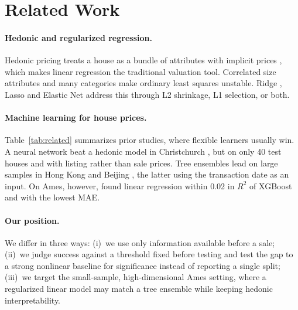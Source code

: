 \section{Related Work}
\label{sec:related}

\paragraph{Hedonic and regularized regression.}
Hedonic pricing treats a house as a bundle of attributes with implicit prices \citep{rosen1974hedonic}, which makes linear regression the traditional valuation tool.
Correlated size attributes and many categories make ordinary least squares unstable.
Ridge \citep{hoerl1970ridge}, Lasso \citep{tibshirani1996lasso} and Elastic Net \citep{zou2005elastic} address this through L2 shrinkage, L1 selection, or both.

\paragraph{Machine learning for house prices.}
Table~\ref{tab:related} summarizes prior studies, where flexible learners usually win.
A neural network beat a hedonic model in Christchurch \citep{limsombunchai2004house}, but on only 40 test houses and with listing rather than sale prices.
Tree ensembles lead on large samples in Hong Kong \citep{ho2021predicting} and Beijing \citep{truong2020housing}, the latter using the transaction date as an input.
On Ames, however, \citet{sharma2024optimal} found linear regression within 0.02 in $R^2$ of XGBoost and with the lowest MAE.

\paragraph{Our position.}
We differ in three ways: (i)~we use only information available before a sale; (ii)~we judge success against a threshold fixed before testing and test the gap to a strong nonlinear baseline for significance instead of reporting a single split; (iii)~we target the small-sample, high-dimensional Ames setting, where a regularized linear model may match a tree ensemble while keeping hedonic interpretability.

